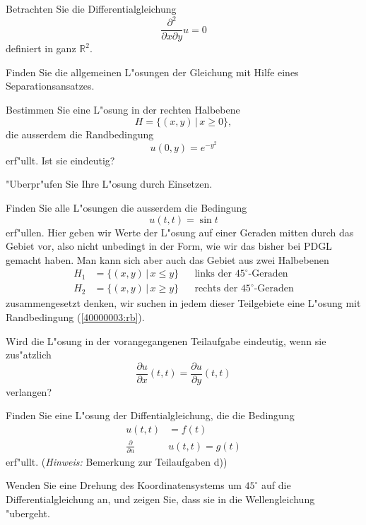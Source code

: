 Betrachten Sie die Differentialgleichung
\[
\frac{\partial^2}{\partial x\partial y}u=0
\]
definiert in ganz $\mathbb R^2$.
\begin{teilaufgaben}
\item
Finden Sie die allgemeinen L"osungen der Gleichung
mit Hilfe eines Separationsansatzes.
\item
Bestimmen Sie eine L"osung in der rechten Halbebene
\[
H=\{(x,y)\,|\, x\ge 0\},
\]
die ausserdem die Randbedingung
\[
u(0,y)=e^{-y^2}
\]
erf"ullt. Ist sie eindeutig?
\item
"Uberpr"ufen Sie Ihre L"osung durch Einsetzen.
\item
Finden Sie alle L"osungen die ausserdem die Bedingung
\begin{equation}
u(t,t)=\sin t
\label{40000003:rb}
\end{equation}
erf"ullen. Hier geben wir Werte der L"osung auf einer Geraden
mitten durch das Gebiet vor, also nicht unbedingt in der Form,
wie wir das bisher bei PDGL gemacht haben. Man kann sich aber
auch das Gebiet aus zwei Halbebenen
\begin{align*}
H_1&=\{(x,y)\,|\,x\le y\}&&\text{links der $45^\circ$-Geraden}
\\
H_2&=\{(x,y)\,|\,x\ge y\}&&\text{rechts der $45^\circ$-Geraden}
\end{align*}
zusammengesetzt denken, wir suchen in jedem dieser Teilgebiete eine
L"osung mit Randbedingung (\ref{40000003:rb}).
\label{40000003:halbebenen}
\item
Wird die L"osung in der vorangegangenen Teilaufgabe eindeutig, wenn sie
zus"atzlich
\[
\frac{\partial u}{\partial x}(t,t)=\frac{\partial u}{\partial y}(t,t)
\]
verlangen?
\item
Finden Sie eine L"osung der Diffentialgleichung, die
die Bedingung
\begin{align*}
u(t,t)&=f(t)\\
\frac{\partial}{\partial n}&u(t,t)=g(t)
\end{align*}
erf"ullt. ({\it Hinweis:} Bemerkung zur Teilaufgaben d))
\item
Wenden Sie eine Drehung des Koordinatensystems um $45^\circ$
auf die Differentialgleichung an, und zeigen Sie,
dass sie in die Wellengleichung "ubergeht.
\end{teilaufgaben}


